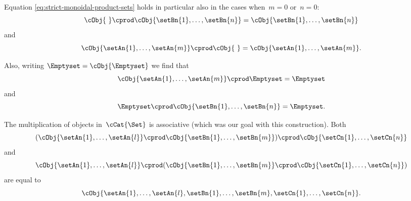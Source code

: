 Equation \cref{eq:strict-monoidal-product-sets} holds in particular also in the cases when~$m = 0$ or~$n =0$:
\begin{equation*}
    \cObj{ \ } \cprod \cObj{\setBn{1}, \ldots, \setBn{n}} = \cObj{\setBn{1}, \ldots, \setBn{n}}
\end{equation*}
and
\begin{equation*}
    \cObj{\setAn{1}, \ldots, \setAn{m}} \cprod \cObj{ \ } = \cObj{\setAn{1}, \ldots, \setAn{m}}.
\end{equation*}

Also, writing $\Emptyset = \cObj{\Emptyset}$ we find that 
\begin{equation*}
    \cObj{\setAn{1}, \ldots, \setAn{m}} \cprod \Emptyset = \Emptyset
\end{equation*}
and
\begin{equation*}
    \Emptyset \cprod \cObj{\setBn{1}, \ldots, \setBn{n}} = \Emptyset.
\end{equation*}

\begin{remark}
    The multiplication of objects in~$\cCat{\Set}$ is associative (which was our goal with this construction). Both
    \begin{equation*}
        ( \cObj{\setAn{1}, \ldots, \setAn{l}} \cprod \cObj{\setBn{1}, \ldots, \setBn{m}}) \cprod \cObj{\setCn{1}, \ldots, \setCn{n}}
    \end{equation*}
    and
    \begin{equation*}
        \cObj{\setAn{1}, \ldots, \setAn{l}} \cprod (\cObj{\setBn{1}, \ldots, \setBn{m}} \cprod \cObj{\setCn{1}, \ldots, \setCn{n}})
    \end{equation*}
    are equal to
    \begin{equation*}
        \cObj{\setAn{1}, \ldots, \setAn{l}, \setBn{1}, \ldots, \setBn{m}, \setCn{1}, \ldots, \setCn{n}}.
    \end{equation*}
\end{remark}
